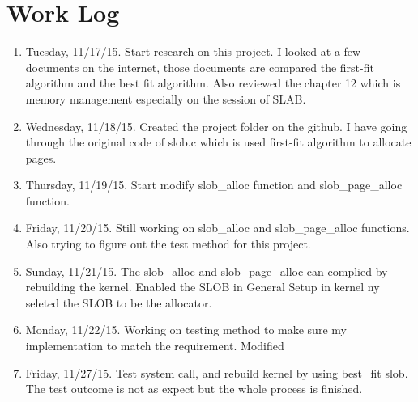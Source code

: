 \documentclass[letterpaper,11pt,titlepage]{article}
\begin{document}
\section{Work Log}
\begin{enumerate}

\item Tuesday, 11/17/15. Start research on this project. I looked at a few documents on the internet, those documents are compared the first-fit algorithm and the best fit algorithm. Also reviewed the chapter 12 which is memory management especially on the session of SLAB.

\item Wednesday, 11/18/15. Created the project folder on the github. I have going through the original code of slob.c which is used first-fit algorithm to allocate pages. 
\item Thursday, 11/19/15. Start modify slob_alloc function and slob_page_alloc function.

\item Friday, 11/20/15. Still working on slob_alloc and slob_page_alloc functions. Also trying to figure out the test method for this project.
\item Sunday, 11/21/15. The slob_alloc and slob_page_alloc can complied by rebuilding the kernel. Enabled the SLOB in General Setup in kernel ny seleted the SLOB to be the allocator. 

\item Monday, 11/22/15. Working on testing method to make sure my implementation to match the requirement. Modified 

\item Friday, 11/27/15. Test system call, and rebuild kernel by using best_fit slob. The test outcome is not as expect but the whole process is finished.

\end{enumerate}
\end{document}
